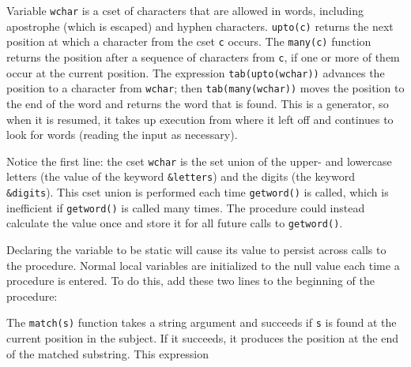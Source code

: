
Variable \texttt{wchar} is a cset of characters that are
allowed in words, including apostrophe (which is escaped) and hyphen
characters. \texttt{upto(c)} returns the next position
at which a character from the cset \texttt{c} occurs. The
\texttt{many(c)} function returns the position after a
sequence of characters from \texttt{c}, if one or more of them occur at
the current position. The expression \texttt{tab(upto(wchar))} advances
the position to a character from \texttt{wchar}; then
\texttt{tab(many(wchar))} moves the position to the end of the word and
returns the word that is found. This is a generator, so when it is
resumed, it takes up execution from where it left off and continues to
look for words (reading the input as necessary).

Notice the first line: the cset \texttt{wchar} is the set union of the
upper- and lowercase letters (the value of the keyword
\texttt{\&letters}) and the digits (the keyword \texttt{\&digits}).
This cset union is performed each time \texttt{getword()} is called,
which is inefficient if \texttt{getword()} is called many times. The
procedure could instead calculate the value once and store it for all
future calls to \texttt{getword()}.

Declaring the variable to be static will cause its value to
persist across calls to the procedure. Normal local variables are
initialized to the null value each time a procedure is entered. To do
this, add these two lines to the beginning of the procedure:


The \texttt{match(s)} function takes a string argument
and succeeds if \texttt{s} is found at the current position in the
subject. If it succeeds, it produces the position at the end of the
matched substring. This expression


